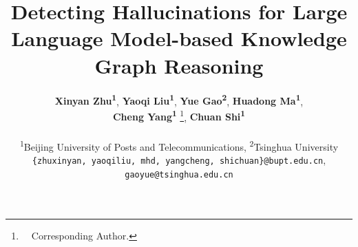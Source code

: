 \documentclass[11pt]{article}
\title{Detecting Hallucinations for Large Language Model-based Knowledge Graph Reasoning}
\author{
  \textbf{Xinyan Zhu\textsuperscript{1}},
  \textbf{Yaoqi Liu\textsuperscript{1}},
  \textbf{Yue Gao\textsuperscript{2}},
  \textbf{Huadong Ma\textsuperscript{1}},
\\
  \textbf{Cheng Yang\textsuperscript{1}} \thanks{\ \ Corresponding Author.},
  \textbf{Chuan Shi\textsuperscript{1}} \footnotemark[1]
\\
\\
  \textsuperscript{1}Beijing University of Posts and Telecommunications, 
  \textsuperscript{2}Tsinghua University
\\
\texttt{\{zhuxinyan, yaoqiliu, mhd, yangcheng, shichuan\}@bupt.edu.cn}, \texttt{gaoyue@tsinghua.edu.cn}
}
\begin{document}
\maketitle
\begin{abstract}


\end{abstract}
\end{document}
